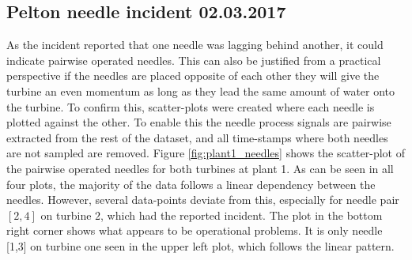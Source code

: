     \subsection{Pelton needle incident 02.03.2017}
        As the incident reported that one needle was lagging behind another, it could indicate pairwise operated needles. This can also be justified from a practical perspective if the needles are placed opposite of each other they will give the turbine an even momentum as long as they lead the same amount of water onto the turbine. To confirm this, scatter-plots were created where each needle is plotted against the other. To enable this the needle process signals are pairwise extracted from the rest of the dataset, and all time-stamps where both needles are not sampled are removed. Figure \ref{fig:plant1_needles} shows the scatter-plot of the pairwise operated needles for both turbines at plant 1. As can be seen in all four plots, the majority of the data follows a linear dependency between the needles. However, several data-points deviate from this, especially for needle pair $[2,4]$ on turbine $2$, which had the reported incident. The plot in the bottom right corner shows what appears to be operational problems. It is only needle [1,3] on turbine one seen in the upper left plot, which follows the linear pattern.

